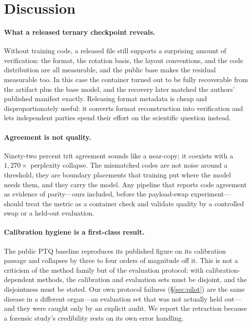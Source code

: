 \section{Discussion}
\label{sec:discussion}

\paragraph{What a released ternary checkpoint reveals.}
Without training code, a released file still supports a surprising amount of
verification: the format, the rotation basis, the layout conventions, and the
code distribution are all measurable, and the public base makes the residual
measurable too. In this case the container turned out to be fully recoverable
from the artifact plus the base model, and the recovery later matched the
authors' published manifest exactly. Releasing format metadata is cheap and
disproportionately useful: it converts format reconstruction into verification
and lets independent parties spend their effort on the scientific question
instead.

\paragraph{Agreement is not quality.}
Ninety-two percent trit agreement sounds like a near-copy; it coexists with a
$1{,}270\times$ perplexity collapse. The mismatched codes are not noise around
a threshold, they are boundary placements that training put where the model
needs them, and they carry the model. Any pipeline that reports code agreement
as evidence of parity---ours included, before the payload-swap experiment---should treat the metric
as a container check and validate quality by a controlled swap or a held-out
evaluation.

\paragraph{Calibration hygiene is a first-class result.}
The public PTQ baseline reproduces its published figure on its calibration
passage and collapses by three to four orders of magnitude off it. This is not
a criticism of the method family but of the evaluation protocol: with
calibration-dependent methods, the calibration and evaluation sets must be
disjoint, and the disjointness must be stated. Our own protocol failures
(\S\ref{sec:pilot}) are the same disease in a different organ---an evaluation
set that was not actually held out---and they were caught only by an explicit
audit. We report the retraction because a forensic study's credibility rests on
its own error handling.

